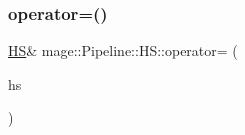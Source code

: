 \hypertarget{structmage_1_1_pipeline_1_1_h_s_a9d264db1a5eeb9050eda11457920949f}{}\label{structmage_1_1_pipeline_1_1_h_s_a9d264db1a5eeb9050eda11457920949f} 
\subsubsection{\texorpdfstring{operator=()}{operator=()}\hspace{0.1cm}{\footnotesize\ttfamily [2/2]}}
{\footnotesize\ttfamily \hyperlink{structmage_1_1_pipeline_1_1_h_s}{HS}\& mage\+::\+Pipeline\+::\+H\+S\+::operator= (\begin{DoxyParamCaption}\item[{\hyperlink{structmage_1_1_pipeline_1_1_h_s}{HS} \&\&}]{hs }\end{DoxyParamCaption})\hspace{0.3cm}{\ttfamily [delete]}}

